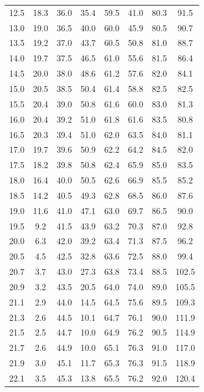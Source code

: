\documentclass[a4paper,fontset=windows]{ctexart}
\begin{document}
\begin{center}
\begin{longtable}{ cccccccc }
        12.5 &  18.3  & 36.0 & 35.4 & 59.5 & 41.0 & 80.3 & 91.5  \\
        13.0 &  19.0  & 36.5 & 40.0 & 60.0 & 45.9 & 80.5 & 90.7  \\
        13.5 &  19.2  & 37.0 & 43.7 & 60.5 & 50.8 & 81.0 & 88.7  \\
        14.0 &  19.7  & 37.5 & 46.5 & 61.0 & 55.6 & 81.5 & 86.4  \\
        14.5 &  20.0  & 38.0 & 48.6 & 61.2 & 57.6 & 82.0 & 84.1  \\
        15.0 &  20.5  & 38.5 & 50.4 & 61.4 & 58.8 & 82.5 & 82.5  \\
        15.5 &  20.4  & 39.0 & 50.8 & 61.6 & 60.0 & 83.0 & 81.3  \\
        16.0 &  20.4  & 39.2 & 51.0 & 61.8 & 61.6 & 83.5 & 80.8  \\
        16.5 &  20.3  & 39.4 & 51.0 & 62.0 & 63.5 & 84.0 & 81.1  \\
        17.0 &  19.7  & 39.6 & 50.9 & 62.2 & 64.2 & 84.5 & 82.0  \\
        17.5 &  18.2  & 39.8 & 50.8 & 62.4 & 65.9 & 85.0 & 83.5  \\
        18.0 &  16.4  & 40.0 & 50.5 & 62.6 & 66.9 & 85.5 & 85.2  \\
        18.5 &  14.2  & 40.5 & 49.3 & 62.8 & 68.5 & 86.0 & 87.6  \\
        19.0 &  11.6  & 41.0 & 47.1 & 63.0 & 69.7 & 86.5 & 90.0  \\
        19.5 &  9.2   & 41.5 & 43.9 & 63.2 & 70.3 & 87.0 & 92.8  \\
        20.0 &  6.3   & 42.0 & 39.2 & 63.4 & 71.3 & 87.5 & 96.2  \\
        20.5 &  4.5   & 42.5 & 32.8 & 63.6 & 72.5 & 88.0 & 99.4  \\
        20.7 &  3.7   & 43.0 & 27.3 & 63.8 & 73.4 & 88.5 & 102.5 \\
        20.9 &  3.2   & 43.5 & 20.5 & 64.0 & 74.0 & 89.0 & 105.5 \\
        21.1 &  2.9   & 44.0 & 14.5 & 64.5 & 75.6 & 89.5 & 109.3 \\
        21.3 &  2.6   & 44.5 & 10.1 & 64.7 & 76.1 & 90.0 & 111.9 \\
        21.5 &  2.5   & 44.7 & 10.0 & 64.9 & 76.2 & 90.5 & 114.9 \\
        21.7 &  2.6   & 44.9 & 10.0 & 65.1 & 76.3 & 91.0 & 117.0 \\
        21.9 &  3.0   & 45.1 & 11.7 & 65.3 & 76.3 & 91.5 & 118.9 \\
        22.1 &  3.5   & 45.3 & 13.8 & 65.5 & 76.2 & 92.0 & 120.4 \\

\end{longtable}
\end{center}
\end{document}
